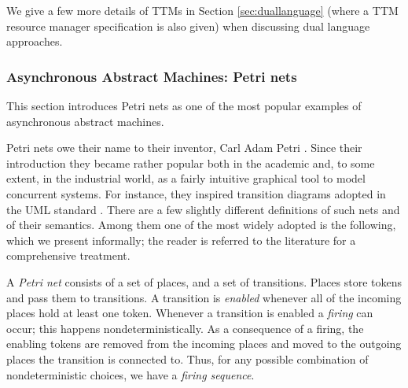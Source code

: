 We give a few more details of TTMs in Section \ref{sec:duallanguage} (where a TTM 
resource manager specification is also given) when discussing 
dual language approaches.


\subsubsection{Asynchronous Abstract Machines: Petri nets} \label{sec:petrinets}
This section introduces Petri nets as one of the most popular 
examples of asynchronous abstract machines.

Petri nets owe their name to their inventor, Carl Adam Petri \cite{Pet63}.
Since their introduction they became rather popular 
both in the academic and, to some extent, in the industrial world, 
as a fairly intuitive graphical tool to model concurrent systems. 
For instance, they inspired transition diagrams adopted in the 
UML standard \cite{UML05,UML04,EPLF03}. There are a few slightly 
different definitions of such nets and of their semantics. Among 
them one of the most widely adopted is the following, which we 
present informally; the reader is referred to the literature \cite{Pet81,Rei85}
for a comprehensive treatment.

A \emph{Petri net} consists of a set of places, and a set of transitions. 
Places store tokens and pass them to transitions. A transition 
is \emph{enabled} whenever all of the incoming places hold at least 
one token. Whenever a transition is enabled a \emph{firing} can 
occur; this happens nondeterministically. As a consequence of 
a firing, the enabling tokens are removed from the incoming places 
and moved to the outgoing places the transition is connected 
to. Thus, for any possible combination of nondeterministic choices, 
we have a \emph{firing sequence}.

